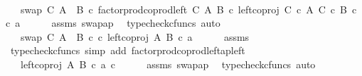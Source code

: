 \begin{isabellebody}
\ \ \isamarkupfalse%
\ \isamarkupfalse%
\ {\isachardoublequoteopen}{\isachardot}{\kern0pt}{\isachardot}{\kern0pt}{\isachardot}{\kern0pt}\ {\isacharequal}{\kern0pt}\ swap\ C\ {\isacharparenleft}{\kern0pt}A\ {\isasymCoprod}\ B{\isacharparenright}{\kern0pt}\ {\isasymcirc}\isactrlsub c\ factor{\isacharunderscore}{\kern0pt}prod{\isacharunderscore}{\kern0pt}coprod{\isacharunderscore}{\kern0pt}left\ C\ A\ B\ {\isasymcirc}\isactrlsub c\ left{\isacharunderscore}{\kern0pt}coproj\ {\isacharparenleft}{\kern0pt}C\ {\isasymtimes}\isactrlsub c\ A{\isacharparenright}{\kern0pt}\ {\isacharparenleft}{\kern0pt}C\ {\isasymtimes}\isactrlsub c\ B{\isacharparenright}{\kern0pt}\ {\isasymcirc}\isactrlsub c\ {\isasymlangle}c{\isacharcomma}{\kern0pt}\ a{\isasymrangle}{\isachardoublequoteclose}\isanewline
\ \ \ \ \isamarkupfalse%
\ assms\ swap{\isacharunderscore}{\kern0pt}ap\ \isamarkupfalse%
\ {\isacharparenleft}{\kern0pt}typecheck{\isacharunderscore}{\kern0pt}cfuncs{\isacharcomma}{\kern0pt}\ auto{\isacharparenright}{\kern0pt}\isanewline
\ \ \isamarkupfalse%
\ \isamarkupfalse%
\ {\isachardoublequoteopen}{\isachardot}{\kern0pt}{\isachardot}{\kern0pt}{\isachardot}{\kern0pt}\ {\isacharequal}{\kern0pt}\ swap\ C\ {\isacharparenleft}{\kern0pt}A\ {\isasymCoprod}\ B{\isacharparenright}{\kern0pt}\ {\isasymcirc}\isactrlsub c\ {\isasymlangle}c{\isacharcomma}{\kern0pt}\ left{\isacharunderscore}{\kern0pt}coproj\ A\ B\ {\isasymcirc}\isactrlsub c\ a{\isasymrangle}{\isachardoublequoteclose}\isanewline
\ \ \ \ \isamarkupfalse%
\ assms\ \isamarkupfalse%
\ {\isacharparenleft}{\kern0pt}typecheck{\isacharunderscore}{\kern0pt}cfuncs{\isacharcomma}{\kern0pt}\ simp\ add{\isacharcolon}{\kern0pt}\ factor{\isacharunderscore}{\kern0pt}prod{\isacharunderscore}{\kern0pt}coprod{\isacharunderscore}{\kern0pt}left{\isacharunderscore}{\kern0pt}ap{\isacharunderscore}{\kern0pt}left{\isacharparenright}{\kern0pt}\isanewline
\ \ \isamarkupfalse%
\ \isamarkupfalse%
\ {\isachardoublequoteopen}{\isachardot}{\kern0pt}{\isachardot}{\kern0pt}{\isachardot}{\kern0pt}\ {\isacharequal}{\kern0pt}\ {\isasymlangle}left{\isacharunderscore}{\kern0pt}coproj\ A\ B\ {\isasymcirc}\isactrlsub c\ a{\isacharcomma}{\kern0pt}\ c{\isasymrangle}{\isachardoublequoteclose}\isanewline
\ \ \ \ \isamarkupfalse%
\ assms\ swap{\isacharunderscore}{\kern0pt}ap\ \isamarkupfalse%
\ {\isacharparenleft}{\kern0pt}typecheck{\isacharunderscore}{\kern0pt}cfuncs{\isacharcomma}{\kern0pt}\ auto{\isacharparenright}{\kern0pt}\isanewline

\end{isabellebody}
